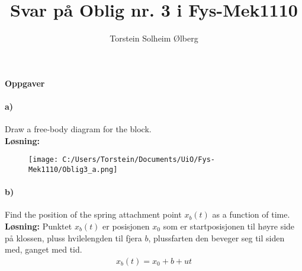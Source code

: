 \documentclass[11pt, A4paper,norsk]{article}
\author{Torstein Solheim Ølberg}
\title{Svar på Oblig nr. 3 i Fys-Mek1110}
\begin{document}
\maketitle
	\begin{center}
\Large \textbf{Oppgaver}
	\end{center}









		\paragraph{a)}
			\begin{flushleft}
Draw a free-body diagram for the block. \\
\vspace{1mm}
\textbf{Løsning:}
\vspace{1mm}
			\end{flushleft}
			\begin{figure}[H]
\texttt{[image: C:/Users/Torstein/Documents/UiO/Fys-Mek1110/Oblig3\_a.png]}
			\end{figure}








		\paragraph{b)}
			\begin{flushleft}
Find the position of the spring attachment point $x_b(t)$ as a function of time. \\
\vspace{1mm}
\textbf{Løsning:}
\vspace{1mm}
Punktet $x_b(t)$ er posisjonen $x_0$ som er startposisjonen til høyre side på klossen, pluss hvilelengden til fjera $b$, plussfarten den beveger seg til siden med, ganget med tid.
				\begin{align}
x_b(t) = x_0 + b + ut
				\end{align}
			\end{flushleft}
\end{document}
